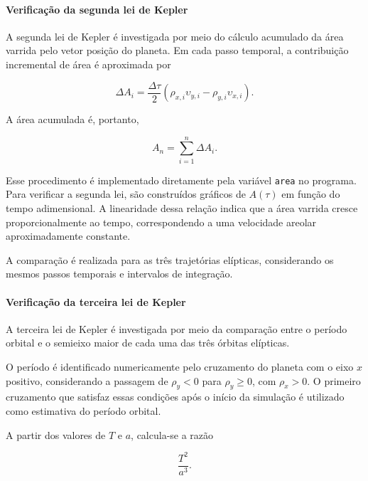 \documentclass[12pt,a4paper]{article}
\begin{document}
\paragraph{Verificação da segunda lei de Kepler}

A segunda lei de Kepler é investigada por meio do cálculo acumulado da área varrida pelo vetor posição do planeta. Em cada passo temporal, a contribuição incremental de área é aproximada por

\begin{equation}
    \Delta A_i=
    \frac{\Delta\tau}{2}
    \left(
    \rho_{x,i}\upsilon_{y,i}
    -
    \rho_{y,i}\upsilon_{x,i}
    \right).
\end{equation}

A área acumulada é, portanto,

\begin{equation}
    A_n=
    \sum_{i=1}^{n}\Delta A_i.
\end{equation}

Esse procedimento é implementado diretamente pela variável \texttt{area} no programa. Para verificar a segunda lei, são construídos gráficos de $A(\tau)$ em função do tempo adimensional. A linearidade dessa relação indica que a área varrida cresce proporcionalmente ao tempo, correspondendo a uma velocidade areolar aproximadamente constante.

A comparação é realizada para as três trajetórias elípticas, considerando os mesmos passos temporais e intervalos de integração.

\paragraph{Verificação da terceira lei de Kepler}

A terceira lei de Kepler é investigada por meio da comparação entre o período orbital e o semieixo maior de cada uma das três órbitas elípticas.

O período é identificado numericamente pelo cruzamento do planeta com o eixo $x$ positivo, considerando a passagem de $\rho_y<0$ para $\rho_y\geq 0$, com $\rho_x>0$. O primeiro cruzamento que satisfaz essas condições após o início da simulação é utilizado como estimativa do período orbital.

A partir dos valores de $T$ e $a$, calcula-se a razão

\begin{equation}
    \frac{T^2}{a^3}.
\end{equation}
\end{document}
